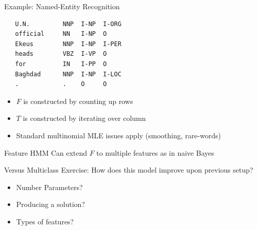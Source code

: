 \documentclass{beamer}
\begin{document}
\begin{frame}[fragile]{Example: Named-Entity Recognition}  
\begin{verbatim}
   U.N.         NNP  I-NP  I-ORG 
   official     NN   I-NP  O 
   Ekeus        NNP  I-NP  I-PER 
   heads        VBZ  I-VP  O 
   for          IN   I-PP  O 
   Baghdad      NNP  I-NP  I-LOC 
   .            .    O     O 
\end{verbatim}


  \begin{itemize}
  \item $F$ is constructed by counting up rows
    \air 
  \item $T$ is constructed by iterating over column
    \air
  \item Standard multinomial MLE issues apply (smoothing, rare-words)
  \end{itemize}
\end{frame}

\begin{frame}{Feature HMM}
  Can extend $F$ to multiple features as in naive Bayes 
\begin{center}  
\end{center}  
\end{frame}

\begin{frame}{Versus Multiclass}
  Exercise: How does this model improve upon previous setup?
  \begin{itemize}
  \item Number Parameters?
    \air 
  \item Producing a solution?
    \air 

  \item Types of features?
  \end{itemize}
\end{frame}
\end{document}
